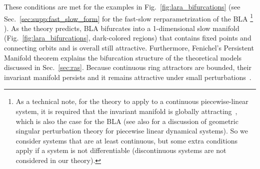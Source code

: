 \documentclass{article} %
\newcounter{ct}
\theoremstyle{definition}
\theoremstyle{remark}
\renewcommand{\cite}{\citep}
\begin{document}
These conditions are met for the examples in Fig.~\ref{fig:lara_bifurcations} (see Sec.~\ref{sec:supp:fast_slow_form} for the fast-slow rerparametrization of the BLA
\footnote{As a technical note, for the theory to apply to a continuous piecewise-linear system, it is required that the invariant manifold is globally attracting~\cite{simpson2018}, which is also the case for the BLA (see also \citep{prohens2013canard,prohens2016slow} for a discussion of geometric singular perturbation theory for piecewise linear dynamical systems). So we consider systems that are at least continuous, but some extra conditions apply if a system is not differentiable (discontinuous systems are not considered in our theory).}
).
As the theory predicts, BLA bifurcates into a 1-dimensional slow manifold (Fig.~\ref{fig:lara_bifurcations}, dark-colored regions) that contains fixed points and connecting orbits and is overall still attractive.
Furthermore, Fenichel's Persistent Manifold theorem explains the bifurcation structure of the theoretical models discussed in Sec.~\ref{sec:ras}.
Because continuous ring attractors are bounded, their invariant manifold persists and it remains attractive under small perturbations~\citep{wiggins1994}.
\end{document}
